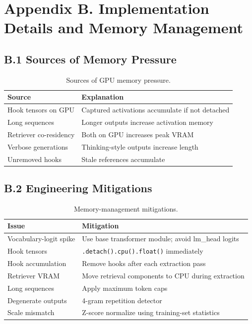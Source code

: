 \section*{Appendix B. Implementation Details and Memory Management}

\subsection*{B.1 Sources of Memory Pressure}

\begin{table}[!htb]
\centering
\caption*{Sources of GPU memory pressure.}
\begin{tabular}{@{}lp{9cm}@{}}
\toprule
\textbf{Source} & \textbf{Explanation} \\
\midrule
Hook tensors on GPU & Captured activations accumulate if not detached \\
Long sequences & Longer outputs increase activation memory \\
Retriever co-residency & Both on GPU increases peak VRAM \\
Verbose generations & Thinking-style outputs increase length \\
Unremoved hooks & Stale references accumulate \\
\bottomrule
\end{tabular}
\end{table}

\subsection*{B.2 Engineering Mitigations}

\begin{table}[!htb]
\centering
\caption*{Memory-management mitigations.}
\begin{tabular}{@{}lp{8cm}@{}}
\toprule
\textbf{Issue} & \textbf{Mitigation} \\
\midrule
Vocabulary-logit spike & Use base transformer module; avoid lm\_head logits \\
Hook tensors & \texttt{.detach().cpu().float()} immediately \\
Hook accumulation & Remove hooks after each extraction pass \\
Retriever VRAM & Move retrieval components to CPU during extraction \\
Long sequences & Apply maximum token caps \\
Degenerate outputs & 4-gram repetition detector \\
Scale mismatch & Z-score normalize using training-set statistics \\
\bottomrule
\end{tabular}
\end{table}

